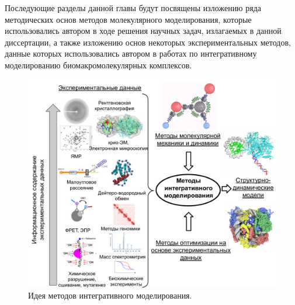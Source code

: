 Последующие разделы данной главы будут посвящены изложению ряда методических основ методов молекулярного моделирования, которые использовались автором в ходе решения научных задач, излагаемых в данной диссертации, а также изложению основ некоторых экспериментальных методов, данные которых использовались автором в работах по интегративному моделированию биомакромолекулярных комплексов.



\begin{figure}[H] 
 \center
 \includegraphics[width=\textwidth] {images/p1/int_mod.pdf}
 \caption{Идея методов интегративного моделирования.} 
 \label{fig:p1:int_mod}
\end{figure}










